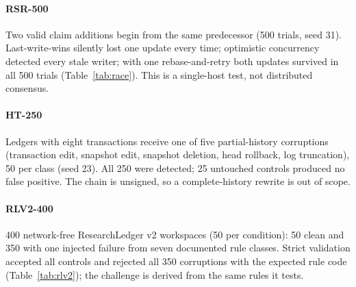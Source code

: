 \documentclass[journal]{IEEEtran}
\begin{document}
\paragraph{RSR-500} Two valid claim additions begin from the same predecessor (500 trials, seed 31). Last-write-wins silently lost one update every time; optimistic concurrency detected every stale writer; with one rebase-and-retry both updates survived in all 500 trials (Table~\ref{tab:race}). This is a single-host test, not distributed consensus.

\begin{table}[!t]
\centering
\caption{RSR-500 stale-writer race results.}
\label{tab:race}
\end{table}

\paragraph{HT-250} Ledgers with eight transactions receive one of five partial-history corruptions (transaction edit, snapshot edit, snapshot deletion, head rollback, log truncation), 50 per class (seed 23). All 250 were detected; 25 untouched controls produced no false positive. The chain is unsigned, so a complete-history rewrite is out of scope.

\paragraph{RLV2-400} 400 network-free ResearchLedger v2 workspaces (50 per condition): 50 clean and 350 with one injected failure from seven documented rule classes. Strict validation accepted all controls and rejected all 350 corruptions with the expected rule code (Table~\ref{tab:rlv2}); the challenge is derived from the same rules it tests.
\end{document}
